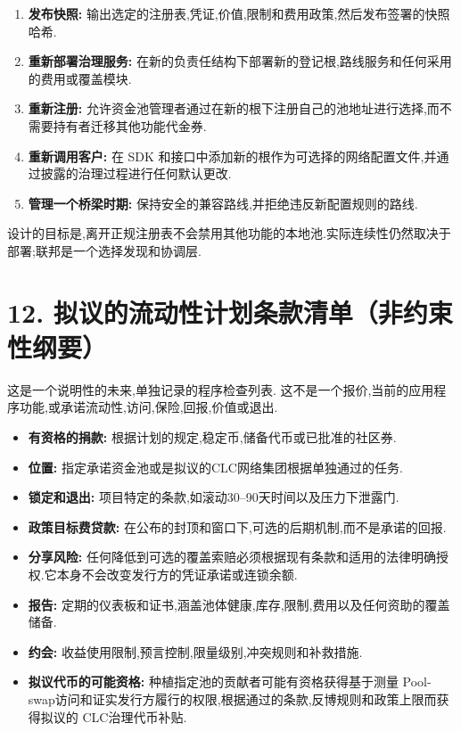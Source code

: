 \documentclass[11pt]{article}
\begin{document}
\begin{enumerate}[leftmargin=*]
\item \textbf{发布快照:} 输出选定的注册表,凭证,价值,限制和费用政策,然后发布签署的快照哈希.
\item \textbf{重新部署治理服务:} 在新的负责任结构下部署新的登记根,路线服务和任何采用的费用或覆盖模块.
\item \textbf{重新注册:} 允许资金池管理者通过在新的根下注册自己的池地址进行选择,而不需要持有者迁移其他功能代金券.
\item \textbf{重新调用客户:} 在 SDK 和接口中添加新的根作为可选择的网络配置文件,并通过披露的治理过程进行任何默认更改.
\item \textbf{管理一个桥梁时期:} 保持安全的兼容路线,并拒绝违反新配置规则的路线.
\end{enumerate}
设计的目标是,离开正规注册表不会禁用其他功能的本地池.实际连续性仍然取决于部署;联邦是一个选择发现和协调层.


\section*{12. 拟议的流动性计划条款清单（非约束性纲要）}

这是一个说明性的未来,单独记录的程序检查列表. 这不是一个报价,当前的应用程序功能,或承诺流动性,访问,保险,回报,价值或退出.

\begin{itemize}[leftmargin=*]
\item \textbf{有资格的捐款:} 根据计划的规定,稳定币,储备代币或已批准的社区券.
\item \textbf{位置:} 指定承诺资金池或是拟议的CLC网络集团根据单独通过的任务.
\item \textbf{锁定和退出:} 项目特定的条款,如滚动30--90天时间以及压力下泄露门.
\item \textbf{政策目标费贷款:} 在公布的封顶和窗口下,可选的后期机制,而不是承诺的回报.
\item \textbf{分享风险:} 任何降低到可选的覆盖索赔必须根据现有条款和适用的法律明确授权.它本身不会改变发行方的凭证承诺或连锁余额.
\item \textbf{报告:} 定期的仪表板和证书,涵盖池体健康,库存,限制,费用以及任何资助的覆盖储备.
\item \textbf{约会:} 收益使用限制,预言控制,限量级别,冲突规则和补救措施.
\item \textbf{拟议代币的可能资格:} 种植指定池的贡献者可能有资格获得基于测量 Pool-swap访问和证实发行方履行的权限,根据通过的条款,反博规则和政策上限而获得拟议的 CLC治理代币补贴.
\end{itemize}
\end{document}
